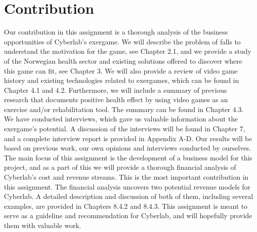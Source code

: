 \section{Contribution}
Our contribution in this assignment is a thorough analysis of the business opportunities of Cyberlab’s exergame. We will describe the problem of falls to understand the motivation for the game, see Chapter 2.1, and we provide a study of the Norwegian health sector and existing solutions offered to discover where this game can fit, see Chapter 3. We will also provide a review of video game history and existing technologies related to exergames, which can be found in Chapter 4.1 and 4.2. Furthermore, we will include a summary of previous research that documents positive health effect by using video games as an exercise and/or rehabilitation tool. The summary can be found in Chapter 4.3. We have conducted interviews, which gave us valuable information about the exergame’s potential. A discussion of the interviews will be found in Chapter 7, and a complete interview report is provided in Appendix A-D. Our results will be based on previous work, our own opinions and interviews conducted by ourselves. The main focus of this assignment is the development of a business model for this project, and as a part of this we will provide a thorough financial analysis of Cyberlab’s cost and revenue streams. This is the most important contribution in this assignment. The financial analysis uncovers two potential revenue models for Cyberlab. A detailed description and discussion of both of them, including several examples, are provided in Chapters 8.4.2 and 8.4.3. This assignment is meant to serve as a guideline and recommendation for Cyberlab, and will hopefully provide them with valuable work.

